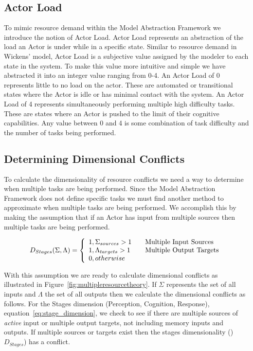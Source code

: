   
\subsection{Actor Load}
To mimic resource demand within the Model Abstraction Framework we introduce the notion of Actor Load.  Actor Load represents an abstraction of the load an Actor is under while in a specific state.  Similar to resource demand in Wickens' model, Actor Load is a subjective value assigned by the modeler to each state in the system.  To make this value more intuitive and simple we have abstracted it into an integer value ranging from 0-4.  An Actor Load of 0 represents little to no load on the actor.  These are automated or transitional states where the Actor is idle or has minimal contact with the system.  An Actor Load of 4 represents simultaneously performing multiple high difficulty tasks.  These are states where an Actor is pushed to the limit of their cognitive capabilities. Any value between 0 and 4 is some combination of task difficulty and the number of tasks being performed.

\subsection{Determining Dimensional Conflicts}
To calculate the dimensionality of resource conflicts we need a way to determine when multiple tasks are being performed.  Since the Model Abstraction Framework does not define specific tasks we must find another method to approximate when multiple tasks are being performed.  We accomplish this by making the assumption that if an Actor has input from multiple sources then multiple tasks are being performed.

\begin{equation}
D_{Stages}(\Sigma, \Lambda) = \left\{ 
  \begin{array}{l l}
    1, \Sigma_{sources} > 1 & \quad \text{Multiple Input Sources}\\
    1, \Lambda_{targets} > 1 & \quad \text{Multiple Output Targets}\\
    0, otherwise
  \end{array}
  \right.
  \label{eq:stage_dimension}
\end{equation}

With this assumption we are ready to calculate dimensional conflicts as illustrated in Figure~\ref{fig:multipleresourcetheory}.  If $\Sigma$ represents the set of all inputs and $\Lambda$ the set of all outputs then we calculate the dimensional conflicts as follows.  For the Stages dimension (Perception, Cognition, Response), equation~\ref{eq:stage_dimension}, we check to see if there are multiple sources of {\em active} input or multiple output targets, not including memory inputs and outputs.  If multiple sources or targets exist then the stages dimensionality ()$D_{Stages}$) has a conflict.

